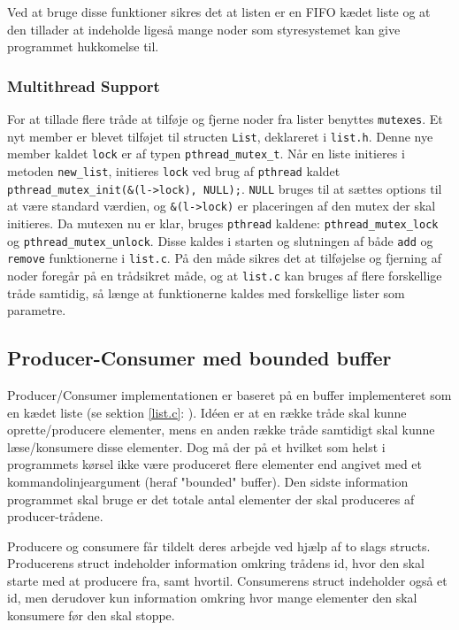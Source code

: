 Ved at bruge disse funktioner sikres det at listen er en FIFO kædet liste og at den tillader at indeholde ligeså mange noder som styresystemet kan give programmet hukkomelse til. 

\subsubsection{Multithread Support}
For at tillade flere tråde at tilføje og fjerne noder fra lister benyttes \texttt{mutexes}. Et nyt member er blevet tilføjet til structen \texttt{List}, deklareret i \texttt{list.h}. Denne nye member kaldet \texttt{lock} er af typen \texttt{pthread\_mutex\_t}. Når en liste initieres i metoden \texttt{new\_list}, initieres \texttt{lock} ved brug af \texttt{pthread} kaldet \texttt{pthread\_mutex\_init(\&(l->lock), NULL);}. \texttt{NULL} bruges til at sættes options til at være standard værdien, og \texttt{\&(l->lock)} er placeringen af den mutex der skal initieres. Da mutexen nu er klar, bruges \texttt{pthread} kaldene: \texttt{pthread\_mutex\_lock} og \texttt{pthread\_mutex\_unlock}. Disse kaldes i starten og slutningen af både \texttt{add} og \texttt{remove} funktionerne i \texttt{list.c}. På den måde sikres det at tilføjelse og fjerning af noder foregår på en trådsikret måde, og at \texttt{list.c} kan bruges af flere forskellige tråde samtidig, så længe at funktionerne kaldes med forskellige lister som parametre.

\subsection{Producer-Consumer med bounded buffer}
Producer/Consumer implementationen er baseret på en buffer implementeret som en kædet liste (se sektion \ref{list.c}: ). Idéen er at en række tråde skal kunne oprette/producere elementer, mens en anden række tråde samtidigt skal kunne læse/konsumere disse elementer. Dog må der på et hvilket som helst i programmets kørsel ikke være produceret flere elementer end angivet med et kommandolinjeargument (heraf "bounded" buffer). Den sidste information programmet skal bruge er det totale antal elementer der skal produceres af producer-trådene.

Producere og consumere får tildelt deres arbejde ved hjælp af to slags structs. Producerens struct indeholder information omkring trådens id, hvor den skal starte med at producere fra, samt hvortil. Consumerens struct indeholder også et id, men derudover kun information omkring hvor mange elementer den skal konsumere før den skal stoppe.\\

